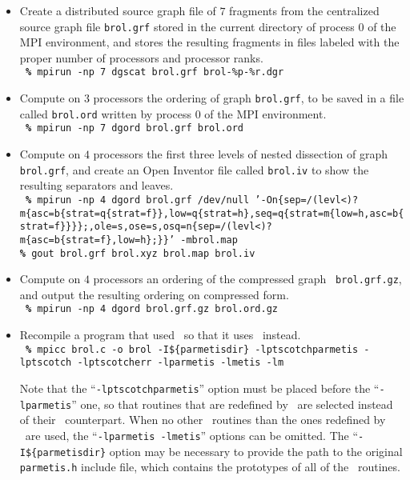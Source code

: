 \begin{itemize}
\item
Create a distributed source graph file of $7$ fragments from the
centralized source graph file {\tt brol.grf} stored in the current
directory of process $0$ of the MPI environment, and stores the
resulting fragments in files labeled with the proper number of
processors and processor ranks.
\\

\noi
{\tt
{\bf\%} mpirun -np 7 dgscat brol.grf brol-\%p-\%r.dgr
}

\item
Compute on $3$ processors the ordering of graph {\tt brol.grf}, to be
saved in a file called {\tt brol.ord} written by process $0$ of the
MPI environment.
\\

\noi
{\tt
{\bf\%} mpirun -np 7 dgord brol.grf brol.ord
}

\item
Compute on $4$ processors the first three levels of nested dissection
of graph {\tt brol.grf}, and create an {\sc Open Inventor} file called
{\tt brol.iv} to show the resulting separators and leaves.
\\

\noi
{\tt
{\bf\%} mpirun -np 4 dgord brol.grf /dev/null '-On\{sep=\lbt /(levl\lbt <)\lbt ?\lbt m\{\lbt asc=\lbt b\{strat=\lbt q\{\lbt strat=\lbt f\}\},\lbt low=\lbt q\{\lbt strat=\lbt h\},\lbt seq=\lbt q\{\lbt strat=\lbt m\{low=\lbt h,asc=\lbt b\{\lbt strat=\lbt f\}\}\}\};,\lbt ole=\lbt s,\lbt ose=\lbt s,\lbt osq=\lbt n\{\lbt sep=\lbt /(levl\lbt <)\lbt ?\lbt m\{asc=\lbt b\{\lbt strat=\lbt f\},\lbt low=\lbt h\};\}\}' -mbrol.map
\\
{\bf\%} gout brol.grf brol.xyz brol.map brol.iv
}
\item
Compute on $4$ processors an ordering of the compressed graph {\tt
brol.\lbt grf.\lbt gz}, and output the resulting ordering on
compressed form.
\\

\noi
{\tt
{\bf\%} mpirun -np 4 dgord brol.grf.gz brol.ord.gz
}
\item
Recompile a program that used \parmetis\ so that it uses \ptscotch\ instead.
\\

\noi
{\tt
{\bf\%} mpicc brol.c -o brol -I\$\{parmetisdir\} -lptscotchparmetis -lptscotch -lptscotcherr -lparmetis -lmetis -lm}
\spa

\noi
Note that the ``{\tt -lptscotch\lbt parmetis}'' option must be placed before the
``{\tt -lparmetis}'' one, so that routines that are redefined by \ptscotch\ are
selected instead of their \parmetis\ counterpart. When no other
\parmetis\ routines than the ones redefined by \ptscotch\ are used, the
``{\tt -lparmetis -lmetis}'' options can be omitted. The ``{\tt -I\$\{parmetisdir\}}
option may be necessary to provide the path to the original {\tt parmetis.h}
include file, which contains the prototypes of all of the \parmetis\ routines.

\end{itemize}
